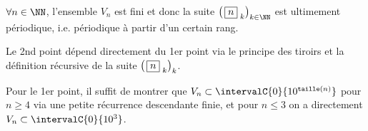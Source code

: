 \medskip

\begin{fact}
	$\forall n \in \NN$, l'ensemble $V_n$ est fini et donc la suite $\left( \, \sqseq{n}{k} \right)_{k \in \NN}$ est ultimement périodique, i.e. périodique à partir d'un certain rang.
\end{fact}

\begin{proof*}
	Le 2nd point dépend directement du 1er point via le principe des tiroirs et la définition récursive de la suite $\left( \, \fbox{$n$}_{\,\,k} \right)_k$.
	
	\medskip
	
	Pour le 1er point, il suffit de montrer que $V_n \subset \intervalC{0}{10^{\taille(n)}}$ pour $n \geqslant 4$ via une petite récurrence descendante finie, et pour $n \leqslant 3$ on a directement $V_n \subset \intervalC{0}{10^3}$.
\end{proof*}